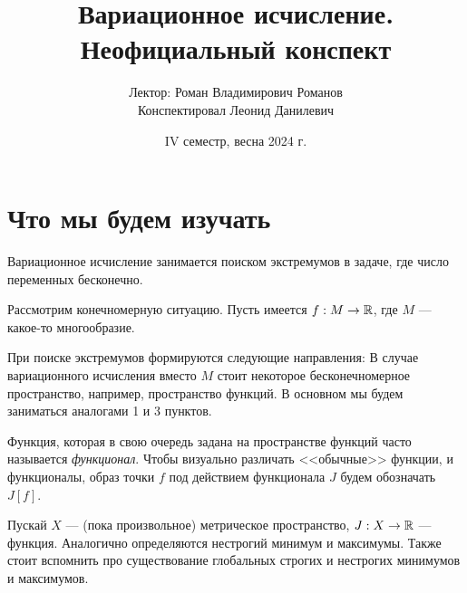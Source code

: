 \documentclass[a4paper]{article}
\date{IV семестр, весна 2024 г.}
\title{Вариационное исчисление. Неофициальный конспект}
\author{Лектор: Роман Владимирович Романов \\ Конспектировал Леонид Данилевич}
\begin{document}
    \maketitle
    \tableofcontents
    \newpage
    \setcounter{lection}{0}
    \section{Что мы будем изучать}
    Вариационное исчисление занимается поиском экстремумов в задаче, где число переменных бесконечно.

    Рассмотрим конечномерную ситуацию.
    Пусть имеется $f: M \rightarrow \mathbb{R}$, где $M$ --- какое-то многообразие.

    При поиске экстремумов формируются следующие направления:
    В случае вариационного исчисления вместо $M$ стоит некоторое бесконечномерное пространство, например, пространство функций.
    В основном мы будем заниматься аналогами 1 и 3 пунктов.

    Функция, которая в свою очередь задана на пространстве функций часто называется \emph{функционал}.
    Чтобы визуально различать <<обычные>> функции, и функционалы, образ точки $f$ под действием функционала $J$ будем обозначать $J[f]$.

    Пускай $X$ --- (пока произвольное) метрическое пространство, $J: X \rightarrow \mathbb{R}$ --- функция.
    Аналогично определяются нестрогий минимум и максимумы.
    Также стоит вспомнить про существование глобальных строгих и нестрогих минимумов и максимумов.
\end{document}
